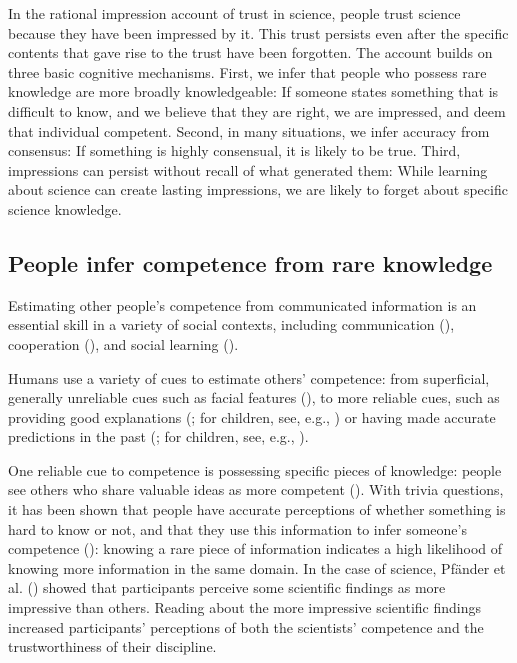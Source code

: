 \documentclass[
  man,
  floatsintext,
  longtable,
  nolmodern,
  notxfonts,
  notimes,
  colorlinks=true,linkcolor=blue,citecolor=blue,urlcolor=blue]{apa7}
\begin{document}
In the rational impression account of trust in science, people trust
science because they have been impressed by it. This trust persists even
after the specific contents that gave rise to the trust have been
forgotten. The account builds on three basic cognitive mechanisms.
First, we infer that people who possess rare knowledge are more broadly
knowledgeable: If someone states something that is difficult to know,
and we believe that they are right, we are impressed, and deem that
individual competent. Second, in many situations, we infer accuracy from
consensus: If something is highly consensual, it is likely to be true.
Third, impressions can persist without recall of what generated them:
While learning about science can create lasting impressions, we are
likely to forget about specific science knowledge.

\subsection{People infer competence from rare
knowledge}\label{people-infer-competence-from-rare-knowledge}

Estimating other people's competence from communicated information is an
essential skill in a variety of social contexts, including communication
(),
cooperation (), and social learning
().

Humans use a variety of cues to estimate others' competence: from
superficial, generally unreliable cues such as facial features
(), to more reliable cues, such as providing good explanations
(;
for children, see, e.g.,
) or having made accurate predictions in the past
(; for children, see, e.g.,
).

One reliable cue to competence is possessing specific pieces of
knowledge: people see others who share valuable ideas as more competent
(). With trivia
questions, it has been shown that people have accurate perceptions of
whether something is hard to know or not, and that they use this
information to infer someone's competence
():
knowing a rare piece of information indicates a high likelihood of
knowing more information in the same domain. In the case of science,
Pfänder et al.
()
showed that participants perceive some scientific findings as more
impressive than others. Reading about the more impressive scientific
findings increased participants' perceptions of both the scientists'
competence and the trustworthiness of their discipline.
\end{document}
